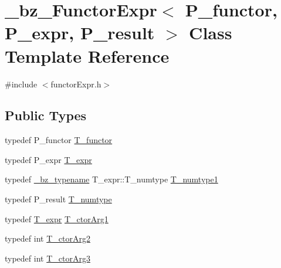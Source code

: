 \hypertarget{class__bz__FunctorExpr}{}\section{\+\_\+bz\+\_\+\+Functor\+Expr$<$ P\+\_\+functor, P\+\_\+expr, P\+\_\+result $>$ Class Template Reference}
\label{class__bz__FunctorExpr}


{\ttfamily \#include $<$functor\+Expr.\+h$>$}

\subsection*{Public Types}
\begin{DoxyCompactItemize}
\item 
typedef P\+\_\+functor \hyperlink{class__bz__FunctorExpr_a6c0ecd2aeb9dea27ad1a9b9cbc6dd869}{T\+\_\+functor}
\item 
typedef P\+\_\+expr \hyperlink{class__bz__FunctorExpr_ae52bb9b2640fb1ad5efde18b4369fdea}{T\+\_\+expr}
\item 
typedef \hyperlink{compiler_8h_a1bc40add3e72effc9cf69dbe445cbdfd}{\+\_\+bz\+\_\+typename} T\+\_\+expr\+::\+T\+\_\+numtype \hyperlink{class__bz__FunctorExpr_adb2f73864a148ca1e9f7022f4ecb3144}{T\+\_\+numtype1}
\item 
typedef P\+\_\+result \hyperlink{class__bz__FunctorExpr_a4adadf2cfc27ce07971936d0b3d5ca65}{T\+\_\+numtype}
\item 
typedef \hyperlink{class__bz__FunctorExpr_ae52bb9b2640fb1ad5efde18b4369fdea}{T\+\_\+expr} \hyperlink{class__bz__FunctorExpr_acd1cb687c3a6280182608eed3c52e0f4}{T\+\_\+ctor\+Arg1}
\item 
typedef int \hyperlink{class__bz__FunctorExpr_ab3fdd6127df9831e764b6d89ced76a86}{T\+\_\+ctor\+Arg2}
\item 
typedef int \hyperlink{class__bz__FunctorExpr_acdea39191b95dc668cc2658c38d6e1a7}{T\+\_\+ctor\+Arg3}
\end{DoxyCompactItemize}

